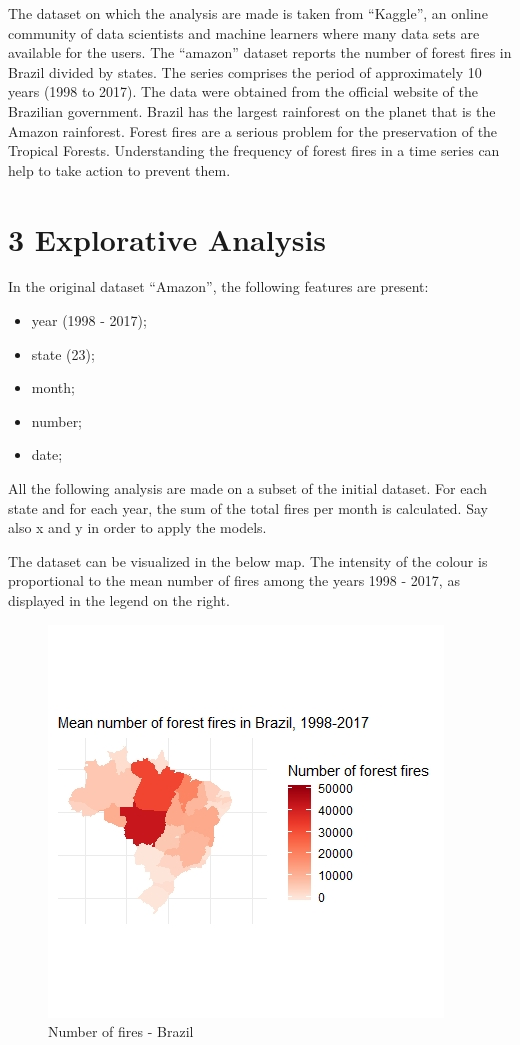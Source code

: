 \documentclass[]{article}
\providecommand{\tightlist}{%
  \setlength{\itemsep}{0pt}\setlength{\parskip}{0pt}}
\begin{document}
The dataset on which the analysis are made is taken from ``Kaggle'', an
online community of data scientists and machine learners where many data
sets are available for the users. The ``amazon'' dataset reports the
number of forest fires in Brazil divided by states. The series comprises
the period of approximately 10 years (1998 to 2017). The data were
obtained from the official website of the Brazilian government. Brazil
has the largest rainforest on the planet that is the Amazon rainforest.
Forest fires are a serious problem for the preservation of the Tropical
Forests. Understanding the frequency of forest fires in a time series
can help to take action to prevent them.

\section{3 Explorative Analysis}\label{explorative-analysis}

In the original dataset ``Amazon'', the following features are present:

\begin{itemize}
\tightlist
\item
  year (1998 - 2017);
\item
  state (23);
\item
  month;
\item
  number;
\item
  date;
\end{itemize}

All the following analysis are made on a subset of the initial dataset.
For each state and for each year, the sum of the total fires per month
is calculated. Say also x and y in order to apply the models.

The dataset can be visualized in the below map. The intensity of the
colour is proportional to the mean number of fires among the years 1998
- 2017, as displayed in the legend on the right.

\begin{figure}
\centering
\includegraphics{brazilmap_1.jpeg}
\caption{Number of fires - Brazil}
\end{figure}
\end{document}
